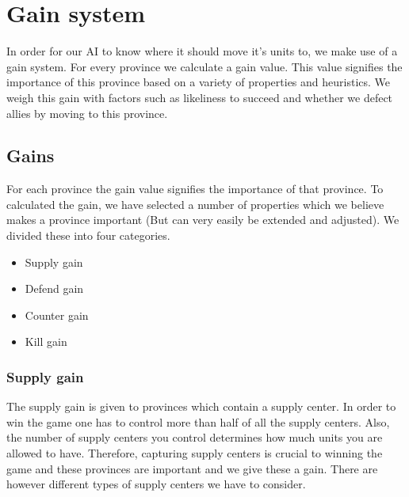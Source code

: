 \documentclass[a4paper]{article} %
\begin{document}
 \begin{center}
\end{center}

\section{Gain system}


In order for our AI to know where it should move it's units to, we make use of a gain system. For every province we calculate a gain value. This value signifies the importance of this province based on a variety of properties and heuristics. We weigh this gain with factors such as likeliness to succeed and whether we defect allies by moving to this province. 

\subsection{Gains}  

For each province the gain value signifies the importance of that province. To calculated the gain, we have selected a number of properties which we believe makes a province important (But can very easily be extended and adjusted). We divided these into four categories. 

\begin{itemize}
\item Supply gain
\item Defend gain
\item Counter gain
\item Kill gain
\end{itemize}

\subsubsection{Supply gain}

The supply gain is given to provinces which contain a supply center. In order to win the game one has to control more than half of all the supply centers. Also, the number of supply centers you control determines how much units you are allowed to have. Therefore, capturing supply centers is crucial to winning the game and these provinces are important and we give these a gain. There are however different types of supply centers we have to consider. 
\end{document}
